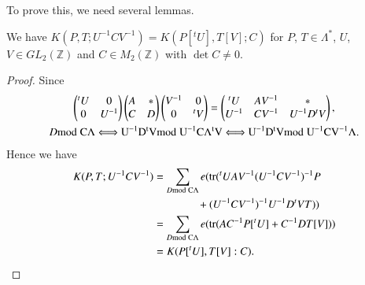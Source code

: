 To prove this, we need several lemmas.

\setcounter{sublemma}{14}
\begin{sublemma}\label{c1:lem-1.5.15}
We have $K(P,T;U^{-1}CV^{-1})=K(P[{}^{t}U],T[V];C)$ for $P$,
$T\in\Lambda^{\ast}$, $U$, $V\in GL_{2}(\mathbb{Z})$ and $C\in
M_{2}(\mathbb{Z})$ with $\det C\neq 0$.
\end{sublemma}

\begin{proof}
Since
\begin{gather*}
\begin{pmatrix}
{}^{t}U & 0\\
0 & U^{-1}
\end{pmatrix}
\begin{pmatrix}
A & \ast\\
C & D
\end{pmatrix}
\begin{pmatrix}
V^{-1} & 0\\
0 & {}^{t}V
\end{pmatrix}
=
\begin{pmatrix}
{}^{t}U & AV^{-1} & \ast\\
U^{-1} & CV^{-1} & U^{-1}D{}^{t}V
\end{pmatrix},\\
D\rm{mod} \; C\Lambda\Longleftrightarrow U^{-1}D{}^{t}V\rm{mod} \;
U^{-1}C\Lambda{}^{t}V\Longleftrightarrow U^{-1}D{}^{t}V\rm{mod} \; U^{-1}CV^{-1}\Lambda.
\end{gather*}
Hence we have 
\begin{align*}
K(P,T;U^{-1}CV^{-1}) & =\sum\limits_{D\rm{mod} \;
  C\Lambda}e(\operatorname{tr}({}^{t}UAV^{-1}(U^{-1}CV^{-1})^{-1}P\\
&\qquad\qquad+(U^{-1}CV^{-1})^{-1}U^{-1}D{}^{t}VT))\\
&=\sum\limits_{D\rm{mod} \;
  C\Lambda}e(\operatorname{tr}(AC^{-1}P[{}^{t}U]+C^{-1}DT[V]))\\
&=K(P[{}^{t}U],T[V]:C).
\end{align*}
\end{proof}

